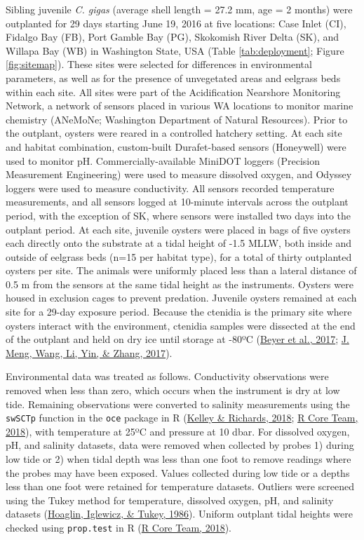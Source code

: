 \documentclass [11pt, proquest] {uwthesis}[2015/03/03]
\begin{document}
Sibling juvenile \emph{C. gigas} (average shell length = 27.2 mm, age = 2 months) were outplanted for 29 days starting June 19, 2016 at five locations: Case Inlet (CI), Fidalgo Bay (FB), Port Gamble Bay (PG), Skokomish River Delta (SK), and Willapa Bay (WB) in Washington State, USA (Table \ref{tab:deployment}; Figure \ref{fig:sitemap}). These sites were selected for differences in environmental parameters, as well as for the presence of unvegetated areas and eelgrass beds within each site. All sites were part of the Acidification Nearshore Monitoring Network, a network of sensors placed in various WA locations to monitor marine chemistry (ANeMoNe; Washington Department of Natural Resources). Prior to the outplant, oysters were reared in a controlled hatchery setting. At each site and habitat combination, custom-built Durafet-based sensors (Honeywell) were used to monitor pH. Commercially-available MiniDOT loggers (Precision Measurement Engineering) were used to measure dissolved oxygen, and Odyssey loggers were used to measure conductivity. All sensors recorded temperature measurements, and all sensors logged at 10-minute intervals across the outplant period, with the exception of SK, where sensors were installed two days into the outplant period. At each site, juvenile oysters were placed in bags of five oysters each directly onto the substrate at a tidal height of -1.5 MLLW, both inside and outside of eelgrass beds (n=15 per habitat type), for a total of thirty outplanted oysters per site. The animals were uniformly placed less than a lateral distance of 0.5 m from the sensors at the same tidal height as the instruments. Oysters were housed in exclusion cages to prevent predation. Juvenile oysters remained at each site for a 29-day exposure period. Because the ctenidia is the primary site where oysters interact with the environment, ctenidia samples were dissected at the end of the outplant and held on dry ice until storage at -80ºC (\protect\hyperlink{ref-Beyer2017}{Beyer et al., 2017}; \protect\hyperlink{ref-Meng2017}{J. Meng, Wang, Li, Yin, \& Zhang, 2017}).

Environmental data was treated as follows. Conductivity observations were removed when less than zero, which occurs when the instrument is dry at low tide. Remaining observations were converted to salinity measurements using the \texttt{swSCTp} function in the \texttt{oce} package in R (\protect\hyperlink{ref-Kelley2018}{Kelley \& Richards, 2018}; \protect\hyperlink{ref-R_Core_Team2018}{R Core Team, 2018}), with temperature at 25ºC and pressure at 10 dbar. For dissolved oxygen, pH, and salinity datasets, data were removed when collected by probes 1) during low tide or 2) when tidal depth was less than one foot to remove readings where the probes may have been exposed. Values collected during low tide or a depths less than one foot were retained for temperature datasets. Outliers were screened using the Tukey method for temperature, dissolved oxygen, pH, and salinity datasets (\protect\hyperlink{ref-Hoaglin1986}{Hoaglin, Iglewicz, \& Tukey, 1986}). Uniform outplant tidal heights were checked using \texttt{prop.test} in R (\protect\hyperlink{ref-R_Core_Team2018}{R Core Team, 2018}).
\end{document}
